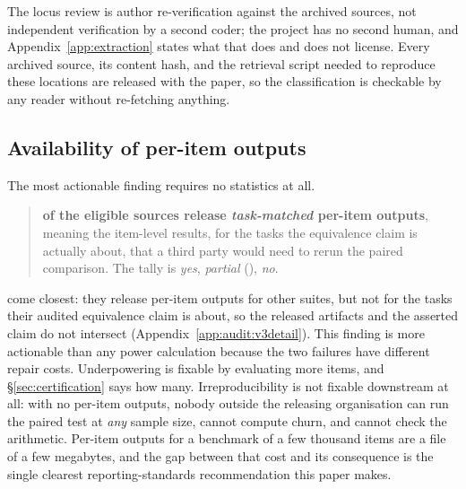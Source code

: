 The locus review is author re-verification against the archived sources, not
independent verification by a second coder; the project has no second human, and
Appendix~\ref{app:extraction} states what that does and does not license. Every
archived source, its content hash, and the retrieval script needed to reproduce
these locations are released with the paper, so the classification is checkable
by any reader without re-fetching anything.

\subsection{Availability of per-item outputs}
\label{sec:audit:v3}

The most actionable finding requires no statistics at all.

%
\begin{quote}
\textbf{\AuditPerItemTaskMatched{} of the \AuditEligible{} eligible sources
release \emph{task-matched} per-item outputs}, meaning the item-level results,
for the tasks the equivalence claim is actually about, that a third party would
need to rerun the paired comparison. The tally is \AuditPerItemTaskMatched{}
\emph{yes}, \AuditPerItemOtherTaskOnly{} \emph{partial}
(\AuditPerItemOtherTaskClaims{}), \AuditPerItemNone{} \emph{no}.
\end{quote}

\AuditPerItemOtherTaskClaims{} come closest: they release per-item outputs for
other suites, but not for the tasks their audited equivalence claim is about, so
the released artifacts and the asserted claim do not intersect
(Appendix~\ref{app:audit:v3detail}). This finding is more actionable than any
power calculation because the two failures have different repair costs.
Underpowering is fixable by evaluating more items, and \S\ref{sec:certification}
says how many. Irreproducibility is not fixable downstream at all: with no
per-item outputs, nobody outside the releasing organisation can run the paired
test at \emph{any} sample size, cannot compute churn, and cannot check the
arithmetic. Per-item outputs for a benchmark of a few thousand items are a file
of a few megabytes, and the gap between that cost and its consequence is the
single clearest reporting-standards recommendation this paper makes.

